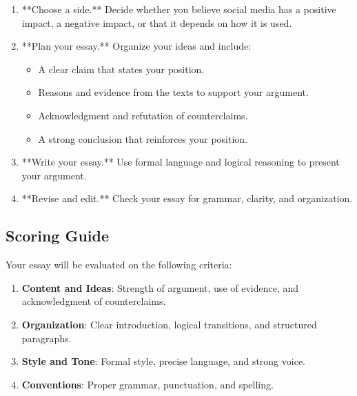 \documentclass[12pt]{article}
\begin{document}
\begin{enumerate}
    \item **Choose a side.** Decide whether you believe social media has a positive impact, a negative impact, or that it depends on how it is used.
    \item **Plan your essay.** Organize your ideas and include:
    \begin{itemize}
        \item A clear claim that states your position.
        \item Reasons and evidence from the texts to support your argument.
        \item Acknowledgment and refutation of counterclaims.
        \item A strong conclusion that reinforces your position.
    \end{itemize}
    \item **Write your essay.** Use formal language and logical reasoning to present your argument.
    \item **Revise and edit.** Check your essay for grammar, clarity, and organization.
\end{enumerate}

\subsection*{Scoring Guide}

Your essay will be evaluated on the following criteria:
\begin{enumerate}
    \item \textbf{Content and Ideas}: Strength of argument, use of evidence, and \\acknowledgment of counterclaims.
    \item \textbf{Organization}: Clear introduction, logical transitions, and structured \\paragraphs.
    \item \textbf{Style and Tone}: Formal style, precise language, and strong voice.
    \item \textbf{Conventions}: Proper grammar, punctuation, and spelling.
\end{enumerate}
\end{document}
